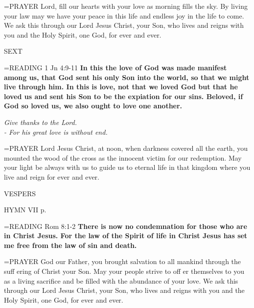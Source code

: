 \hangindent=\parindent \small{PRAYER  Lord, fill our hearts with your love as morning fills the sky. By living your law may we have your peace in this life and endless joy in the life to come. We ask this through our Lord Jesus Christ, your Son, who lives and reigns with you and the Holy Spirit, one God, for ever and ever.}

\begin{flushleft}\normalsize SEXT\\\end{flushleft}

\hangindent=\parindent \small{READING} 1 Jn 4:9-11 \textbf{In this the love of God was made manifest among us, that God sent his only Son into the world, so that we might live through him. In this is love, not that we loved God but that he loved us and sent his Son to be the expiation for our sins. Beloved, if God so loved us, we also ought to love one another.}

\begin{center}
\textit{Give thanks to the Lord.\\
- For his great love is without end.}
\end{center}

\hangindent=\parindent \small{PRAYER  Lord Jesus Christ, at noon, when darkness covered all the earth, you mounted the wood of the cross as the innocent victim for our redemption. May your light be always with us to guide us to eternal life in that kingdom where you live and reign for ever and ever.}

\begin{flushleft}\normalsize VESPERS\\\end{flushleft}

HYMN VII p. \pageref{ordinaryTime:lastHymn}

\hangindent=\parindent \small{READING} Rom 8:1-2 \textbf{There is now no condemnation for those who are in Christ Jesus. For the law of the Spirit of life in Christ Jesus has set me free from the law of sin and death.  \\}

\hangindent=\parindent \small{PRAYER  God our Father, you brought salvation to all mankind through the suff ering of Christ your Son. May your people strive to off er themselves to you as a living sacrifice and be filled with the abundance of your love. We ask this through our Lord Jesus Christ, your Son, who lives and reigns with you and the Holy Spirit, one God, for ever and ever.}

